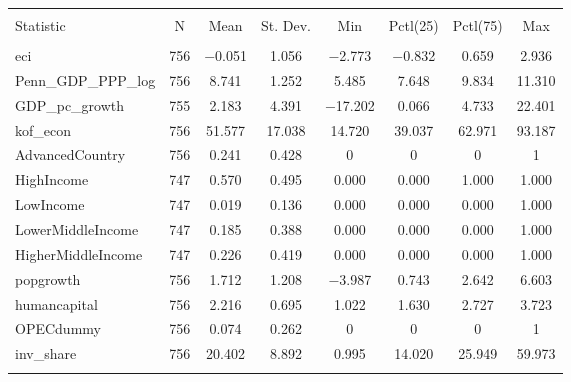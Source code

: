 
\begin{tabular}{@{\extracolsep{5pt}}lccccccc} 
\\[-1.8ex]\hline 
\hline \\[-1.8ex] 
Statistic & \multicolumn{1}{c}{N} & \multicolumn{1}{c}{Mean} & \multicolumn{1}{c}{St. Dev.} & \multicolumn{1}{c}{Min} & \multicolumn{1}{c}{Pctl(25)} & \multicolumn{1}{c}{Pctl(75)} & \multicolumn{1}{c}{Max} \\ 
\hline \\[-1.8ex] 
eci & 756 & $-$0.051 & 1.056 & $-$2.773 & $-$0.832 & 0.659 & 2.936 \\ 
Penn\_GDP\_PPP\_log & 756 & 8.741 & 1.252 & 5.485 & 7.648 & 9.834 & 11.310 \\ 
GDP\_pc\_growth & 755 & 2.183 & 4.391 & $-$17.202 & 0.066 & 4.733 & 22.401 \\ 
kof\_econ & 756 & 51.577 & 17.038 & 14.720 & 39.037 & 62.971 & 93.187 \\ 
AdvancedCountry & 756 & 0.241 & 0.428 & 0 & 0 & 0 & 1 \\ 
HighIncome & 747 & 0.570 & 0.495 & 0.000 & 0.000 & 1.000 & 1.000 \\ 
LowIncome & 747 & 0.019 & 0.136 & 0.000 & 0.000 & 0.000 & 1.000 \\ 
LowerMiddleIncome & 747 & 0.185 & 0.388 & 0.000 & 0.000 & 0.000 & 1.000 \\ 
HigherMiddleIncome & 747 & 0.226 & 0.419 & 0.000 & 0.000 & 0.000 & 1.000 \\ 
popgrowth & 756 & 1.712 & 1.208 & $-$3.987 & 0.743 & 2.642 & 6.603 \\ 
humancapital & 756 & 2.216 & 0.695 & 1.022 & 1.630 & 2.727 & 3.723 \\ 
OPECdummy & 756 & 0.074 & 0.262 & 0 & 0 & 0 & 1 \\ 
inv\_share & 756 & 20.402 & 8.892 & 0.995 & 14.020 & 25.949 & 59.973 \\ 
\hline \\[-1.8ex] 
\end{tabular} 
